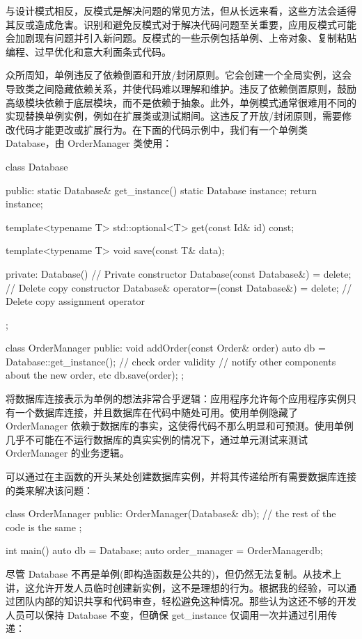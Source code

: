 
与设计模式相反，反模式是解决问题的常见方法，但从长远来看，这些方法会适得其反或造成危害。识别和避免反模式对于解决代码问题至关重要，应用反模式可能会加剧现有问题并引入新问题。反模式的一些示例包括单例、上帝对象、复制粘贴编程、过早优化和意大利面条式代码。

众所周知，单例违反了依赖倒置和开放/封闭原则。它会创建一个全局实例，这会导致类之间隐藏依赖关系，并使代码难以理解和维护。违反了依赖倒置原则，鼓励高级模块依赖于底层模块，而不是依赖于抽象。此外，单例模式通常很难用不同的实现替换单例实例，例如在扩展类或测试期间。这违反了开放/封闭原则，需要修改代码才能更改或扩展行为。在下面的代码示例中，我们有一个单例类 Database，由 OrderManager 类使用：

\begin{cpp}
class Database {
    public:
    static Database& get_instance() {
        static Database instance;
        return instance;
    }

    template<typename T>
    std::optional<T> get(const Id& id) const;

    template<typename T>
    void save(const T& data);

private:
    Database() {} // Private constructor
    Database(const Database&) = delete; // Delete copy constructor
    Database& operator=(const Database&) = delete; // Delete copy assignment operator
};

class OrderManager {
public:
    void addOrder(const Order& order) {
        auto db = Database::get_instance();
        // check order validity
        // notify other components about the new order, etc
        db.save(order);
    }
};
\end{cpp}

将数据库连接表示为单例的想法非常合乎逻辑：应用程序允许每个应用程序实例只有一个数据库连接，并且数据库在代码中随处可用。使用单例隐藏了 OrderManager 依赖于数据库的事实，这使得代码不那么明显和可预测。使用单例几乎不可能在不运行数据库的真实实例的情况下，通过单元测试来测试 OrderManager 的业务逻辑。

可以通过在主函数的开头某处创建数据库实例，并将其传递给所有需要数据库连接的类来解决该问题：

\begin{cpp}
class OrderManager {
    public:
    OrderManager(Database& db);
    // the rest of the code is the same
};

int main() {
    auto db = Database{};
    auto order_manager = OrderManager{db};
}
\end{cpp}

尽管 Database 不再是单例(即构造函数是公共的)，但仍然无法复制。从技术上讲，这允许开发人员临时创建新实例，这不是理想的行为。根据我的经验，可以通过团队内部的知识共享和代码审查，轻松避免这种情况。那些认为这还不够的开发人员可以保持 Database 不变，但确保 get\_instance 仅调用一次并通过引用传递：

